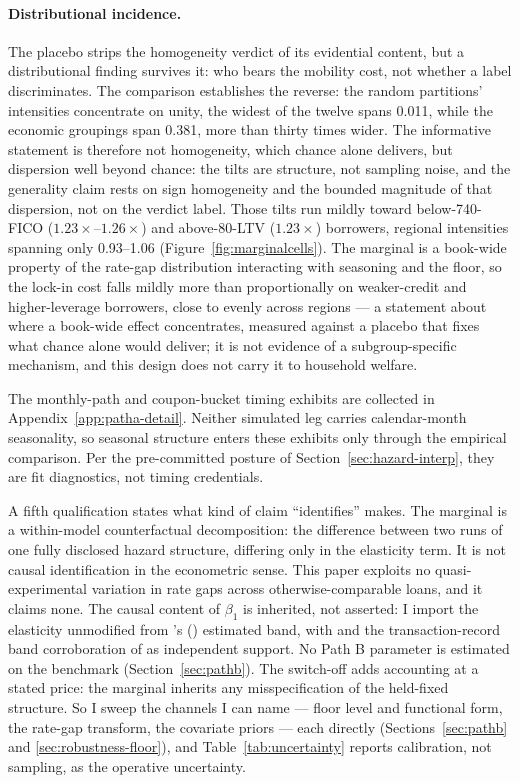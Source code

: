 \documentclass[12pt]{article}
\newcommand{\citepos}[1]{\citeauthor{#1}'s (\citeyear{#1})}
\begin{document}
\paragraph{Distributional incidence.} The placebo strips the homogeneity verdict of its evidential content, but a distributional finding survives it: who bears the mobility cost, not whether a label discriminates. The comparison establishes the reverse: the random partitions' intensities concentrate on unity, the widest of the twelve spans 0.011, while the economic groupings span 0.381, more than thirty times wider. The informative statement is therefore not homogeneity, which chance alone delivers, but dispersion well beyond chance: the tilts are structure, not sampling noise, and the generality claim rests on sign homogeneity and the bounded magnitude of that dispersion, not on the verdict label. Those tilts run mildly toward below-740-FICO ($1.23\times$--$1.26\times$) and above-80-LTV ($1.23\times$) borrowers, regional intensities spanning only 0.93--1.06 (Figure~\ref{fig:marginalcells}). The marginal is a book-wide property of the rate-gap distribution interacting with seasoning and the floor, so the lock-in cost falls mildly more than proportionally on weaker-credit and higher-leverage borrowers, close to evenly across regions --- a statement about where a book-wide effect concentrates, measured against a placebo that fixes what chance alone would deliver; it is not evidence of a subgroup-specific mechanism, and this design does not carry it to household welfare.

The monthly-path and coupon-bucket timing exhibits are collected in Appendix~\ref{app:patha-detail}. Neither simulated leg carries calendar-month seasonality, so seasonal structure enters these exhibits only through the empirical comparison. Per the pre-committed posture of Section~\ref{sec:hazard-interp}, they are fit diagnostics, not timing credentials.

A fifth qualification states what kind of claim ``identifies'' makes. The marginal is a within-model counterfactual decomposition: the difference between two runs of one fully disclosed hazard structure, differing only in the elasticity term. It is not causal identification in the econometric sense. This paper exploits no quasi-experimental variation in rate gaps across otherwise-comparable loans, and it claims none. The causal content of $\beta_1$ is inherited, not asserted: I import the elasticity unmodified from \citepos{liebersohn2024} estimated band, with \citet{fonseca2024} and the transaction-record band corroboration of \citet{graybill2026} as independent support. No Path B parameter is estimated on the benchmark (Section~\ref{sec:pathb}). The switch-off adds accounting at a stated price: the marginal inherits any misspecification of the held-fixed structure. So I sweep the channels I can name --- floor level and functional form, the rate-gap transform, the covariate priors --- each directly (Sections~\ref{sec:pathb} and \ref{sec:robustness-floor}), and Table~\ref{tab:uncertainty} reports calibration, not sampling, as the operative uncertainty.
\end{document}
